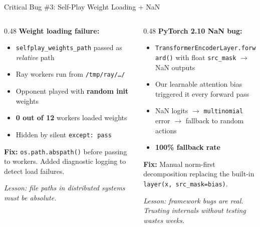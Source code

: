 \documentclass[aspectratio=169, 11pt]{beamer}
\begin{document}
\begin{frame}{Critical Bug \#3: Self-Play Weight Loading + NaN}
  \begin{columns}[T]
    \begin{column}{0.48\textwidth}
      \textbf{Weight loading failure:}
      \begin{itemize}\setlength{\itemsep}{0.25em}
        \item \texttt{selfplay\_weights\_path} passed as \emph{relative} path
        \item Ray workers run from \texttt{/tmp/ray/\ldots/}
        \item Opponent played with \textbf{random init} weights
        \item \textbf{0 out of 12} workers loaded weights
        \item Hidden by silent \texttt{except: pass}
      \end{itemize}

      \vspace{0.4em}
      \textbf{Fix:} \texttt{os.path.abspath()} before passing to workers.
      Added diagnostic logging to detect load failures.

      \vspace{0.3em}
      \small\textit{Lesson: file paths in distributed systems must be absolute.}
    \end{column}

    \begin{column}{0.48\textwidth}
      \textbf{PyTorch 2.10 NaN bug:}
      \begin{itemize}\setlength{\itemsep}{0.25em}
        \item \texttt{TransformerEncoderLayer.forward()} with float
              \texttt{src\_mask} $\to$ NaN outputs
        \item Our learnable attention bias triggered it every forward pass
        \item NaN logits $\to$ \texttt{multinomial} error $\to$ fallback to
              random actions
        \item \textbf{100\% fallback rate}
      \end{itemize}

      \vspace{0.4em}
      \textbf{Fix:} Manual norm-first decomposition replacing the built-in
      \texttt{layer(x, src\_mask=bias)}.

      \vspace{0.3em}
      \small\textit{Lesson: framework bugs are real. Trusting internals without
      testing wastes weeks.}
    \end{column}
  \end{columns}
\end{frame}
\end{document}
